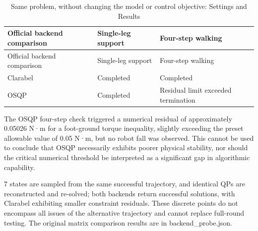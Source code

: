 \FloatBarrier\begingroup\small\setlength{\tabcolsep}{2.5pt}
\begin{longtable}[]{@{}
  >{\raggedright\arraybackslash}p{}
  >{\raggedright\arraybackslash}p{}
  >{\raggedright\arraybackslash}p{}@{}}
\caption{Same problem, without changing the model or control objective: Settings and Results}\label{tab:s27-1}\tabularnewline
\toprule\noalign{}
\begin{minipage}[b]{\linewidth}\raggedright
Official backend comparison
\end{minipage} & \begin{minipage}[b]{\linewidth}\raggedright
Single-leg support
\end{minipage} & \begin{minipage}[b]{\linewidth}\raggedright
Four-step walking
\end{minipage} \\
\midrule\noalign{}
\endfirsthead
\toprule\noalign{}
\begin{minipage}[b]{\linewidth}\raggedright
Official backend comparison
\end{minipage} & \begin{minipage}[b]{\linewidth}\raggedright
Single-leg support
\end{minipage} & \begin{minipage}[b]{\linewidth}\raggedright
Four-step walking
\end{minipage} \\
\midrule\noalign{}
\endhead
\bottomrule\noalign{}
\endlastfoot
Clarabel & Completed & Completed \\
OSQP & Completed & Residual limit exceeded termination \\
\end{longtable}\endgroup

The OSQP four-step check triggered a numerical residual of approximately 0.05026 N·m for a foot-ground torque inequality, slightly exceeding the preset allowable value of 0.05 N·m, but no robot fall was observed. This cannot be used to conclude that OSQP necessarily exhibits poorer physical stability, nor should the critical numerical threshold be interpreted as a significant gap in algorithmic capability.

7 states are sampled from the same successful trajectory, and identical QPs are reconstructed and re-solved; both backends return successful solutions, with Clarabel exhibiting smaller constraint residuals. These discrete points do not encompass all issues of the alternative trajectory and cannot replace full-round testing. The original matrix comparison results are in backend\_probe.json.

